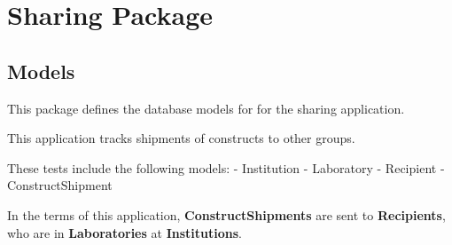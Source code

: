 \documentclass[letterpaper,10pt,english]{sphinxmanual}
\begin{document}
\section{Sharing Package}
\label{api:sharing-package}\label{api:module-experimentdb.sharing}

\subsection{Models}
\label{api:id23}\label{api:module-experimentdb.sharing.models}
This package defines the database models for for the sharing application.

This application tracks shipments of constructs to other groups.

These tests include the following models:
- Institution
- Laboratory
- Recipient
- ConstructShipment

In the terms of this application, \textbf{ConstructShipments} are sent to \textbf{Recipients}, who are in \textbf{Laboratories} at \textbf{Institutions}.
\end{document}
